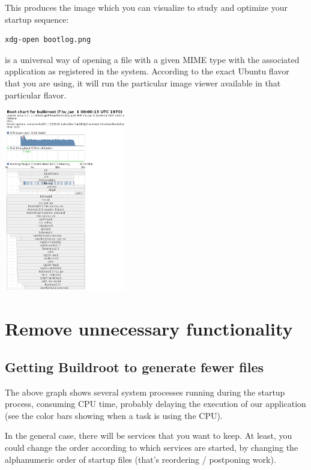 This produces the  image which you can visualize to
study and optimize your startup sequence:

\begin{verbatim}
xdg-open bootlog.png
\end{verbatim}

 is a universal way of opening a file with a given MIME
type with the associated application as registered in the system.
According to the exact Ubuntu flavor that you are using,
it will run the particular image viewer available in that
particular flavor.

\begin{center}
\includegraphics[height=8cm]{labs/boot-time-init-scripts/bootlog.png}
\end{center}

\section{Remove unnecessary functionality}

\subsection{Getting Buildroot to generate fewer files}

The above graph shows several system processes running
during the startup process, consuming CPU time, probably delaying
the execution of our application (see the color bars showing when
a task is using the CPU).

In the general case, there will be services that you want to keep. At
least, you could change the order according to which services are
started, by changing the alphanumeric order of startup files (that's
reordering / postponing work).

